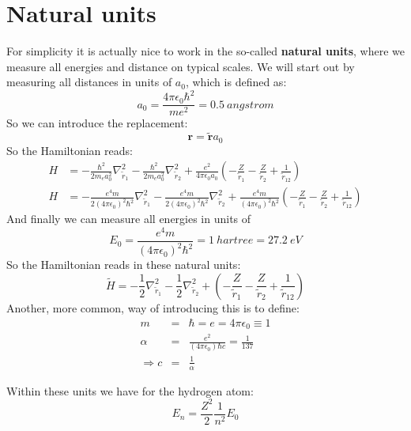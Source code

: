 \documentclass[10pt]{article}
\begin{document}
\section{Natural units}
For simplicity it is actually nice to work in the so-called \textbf{natural units}, where we measure all energies and distance on typical scales. We will start out by measuring all distances in units of $a_0$, which is defined as:
\begin{equation}
a_0 = \frac{4\pi \epsilon_0 \hbar^2}{me^2} = \SI{0.5}{angstrom}
\end{equation}
So we can introduce the replacement:
\begin{equation}
\mathbf{r} = \mathbf{\tilde{r}}a_0
\end{equation}
So the Hamiltonian reads:
\begin{eqnarray}
H &= -\frac{\hbar^2}{2m_ea_0^2}\nabla_{\tilde{r}_1}^2 -\frac{\hbar^2}{2m_ea_0^2}\nabla_{\tilde{r}_2}^2+\frac{e^2}{4\pi \epsilon_0 a_0}\left(-\frac{Z}{\tilde{r}_1}-\frac{Z}{\tilde{r}_2}+\frac{1}{\tilde{r}_{12}}\right)\\
H &= -\frac{e^4 m}{2(4\pi\epsilon_0)^2 \hbar^2}\nabla_{\tilde{r}_1}^2 -\frac{e^4 m}{2(4\pi\epsilon_0)^2 \hbar^2}\nabla_{\tilde{r}_2}^2+\frac{e^4 m}{(4\pi \epsilon_0)^2\hbar^2}\left(-\frac{Z}{\tilde{r}_1}-\frac{Z}{\tilde{r}_2}+\frac{1}{\tilde{r}_{12}}\right)
\end{eqnarray}
And finally we can measure all energies in units of
\begin{equation}
E_0 = \frac{e^4 m}{(4\pi\epsilon_0)^2\hbar^2} = \SI{1}{hartree} = \SI{27.2}{eV}
\end{equation}
So the Hamiltonian reads in these natural units:
\begin{equation}
\label{eq:HeliumReduced}
\tilde{H} = -\frac{1}{2}\nabla_{\tilde{r}_1}^2 -\frac{1}{2}\nabla_{\tilde{r}_2}^2+\left(-\frac{Z}{\tilde{r}_1}-\frac{Z}{\tilde{r}_2}+\frac{1}{\tilde{r}_{12}}\right)
\end{equation}
Another, more common, way of introducing this is to define:
\begin{eqnarray}
m &=& \hbar = e = 4\pi \epsilon_0 \equiv 1\\
\alpha &=& \frac{e^2}{(4\pi \epsilon_0) \hbar c}= \frac{1}{137}\\
\Rightarrow c &=& \frac{1}{\alpha}
\end{eqnarray}

Within these units we have for the hydrogen atom:
\begin{equation}
E_n = \frac{Z^2}{2}\frac{1}{n^2}E_0
\end{equation}
\end{document}
